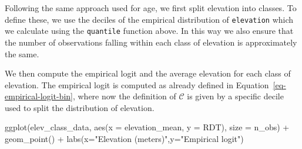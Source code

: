 \documentclass[
  letterpaper,
]{krantz}
\newenvironment{Shaded}{\begin{snugshade}}{\end{snugshade}}
\newcommand{\AttributeTok}[1]{\textcolor[rgb]{0.40,0.45,0.13}{#1}}
\newcommand{\CommentTok}[1]{\textcolor[rgb]{0.37,0.37,0.37}{#1}}
\newcommand{\ControlFlowTok}[1]{\textcolor[rgb]{0.00,0.23,0.31}{#1}}
\newcommand{\FloatTok}[1]{\textcolor[rgb]{0.68,0.00,0.00}{#1}}
\newcommand{\FunctionTok}[1]{\textcolor[rgb]{0.28,0.35,0.67}{#1}}
\newcommand{\NormalTok}[1]{\textcolor[rgb]{0.00,0.23,0.31}{#1}}
\newcommand{\OtherTok}[1]{\textcolor[rgb]{0.00,0.23,0.31}{#1}}
\newcommand{\SpecialCharTok}[1]{\textcolor[rgb]{0.37,0.37,0.37}{#1}}
\newcommand{\StringTok}[1]{\textcolor[rgb]{0.13,0.47,0.30}{#1}}
\begin{document}
Following the same approach used for age, we first split elevation into
classes. To define these, we use the deciles of the empirical
distribution of \texttt{elevation} which we calculate using the
\texttt{quantile} function above. In this way we also ensure that the
number of observations falling within each class of elevation is
approximately the same.

\begin{Shaded}
\end{Shaded}

We then compute the empirical logit and the average elevation for each
class of elevation. The empirical logit is computed as already defined
in Equation~\ref{eq-empirical-logit-bin}, where now the definition of
\(\mathcal{C}\) is given by a specific decile used to split the
distribution of elevation.

\begin{Shaded}
\begin{Highlighting}[]
\FunctionTok{ggplot}\NormalTok{(elev\_class\_data, }\FunctionTok{aes}\NormalTok{(}\AttributeTok{x =}\NormalTok{ elevation\_mean, }\AttributeTok{y =}\NormalTok{ RDT), }
                           \AttributeTok{size =}\NormalTok{ n\_obs) }\SpecialCharTok{+} 
  \FunctionTok{geom\_point}\NormalTok{() }\SpecialCharTok{+} 
  \FunctionTok{labs}\NormalTok{(}\AttributeTok{x=}\StringTok{"Elevation (meters)"}\NormalTok{,}\AttributeTok{y=}\StringTok{"Empirical logit"}\NormalTok{)  }
\end{Highlighting}
\end{Shaded}
\end{document}
